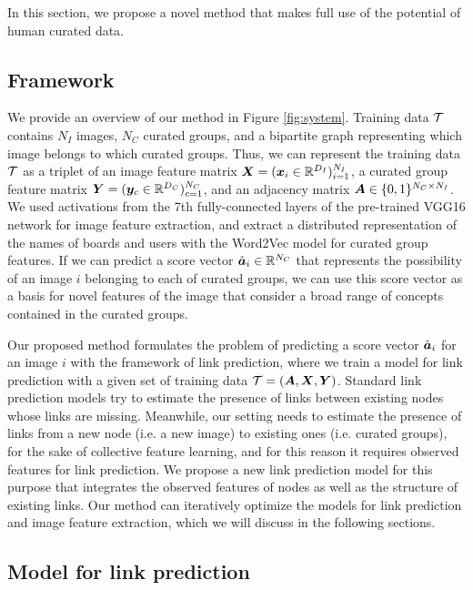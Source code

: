 \documentclass[letterpaper]{article} %
\begin{document}
In this section, we propose a novel method that makes full use of the potential of human curated data.

\subsection{Framework}
\label{sec:proposed:framework}
\indent

We provide an overview of our method in Figure \ref{fig:system}.
Training data $\mathcal T$ contains $N_I$ images, $N_C$ curated groups, and a bipartite graph representing which image belongs to which curated groups.
Thus, we can represent the training data $\mathcal T$ as a triplet of an image feature matrix $\bm{X}=(\bm{x}_i\in\mathbb R^{D_I})_{i=1}^{N_I}$, a curated group feature matrix $\bm{Y}=(\bm{y}_c\in\mathbb R^{D_C})_{c=1}^{N_C}$, and an adjacency matrix $\bm{A}\in\{0,1\}^{N_C\times N_I}$.
We used activations from the 7th fully-connected layers of the pre-trained VGG16 network \cite{Simonyan2014} for image feature extraction, and extract a distributed representation of the names of boards and users with the Word2Vec model \cite{Mikolov2013} for curated group features.
If we can predict a score vector $\hat{\bm{a}}_i\in\mathbb R^{N_C}$ that represents the possibility of an image $i$ belonging to each of curated groups, we can use this score vector as a basis for novel features of the image that consider a broad range of concepts contained in the curated groups.

Our proposed method formulates the problem of predicting a score vector $\hat{\bm{a}}_i$ for an image $i$ with the framework of link prediction, where we train a model for link prediction with a given set of training data $\mathcal T=(\bm{A},\bm{X},\bm{Y})$.
Standard link prediction models try to estimate the presence of links between existing nodes whose links are missing.
Meanwhile, our setting needs to estimate the presence of links from a new node (i.e. a new image) to existing ones (i.e. curated groups), for the sake of collective feature learning, and for this reason it requires observed features for link prediction.
We propose a new link prediction model for this purpose that integrates the observed features of nodes as well as the structure of existing links.
Our method can iteratively optimize the models for link prediction and image feature extraction, which we will discuss in the following sections.

\subsection{Model for link prediction}
\label{sec:proposed:link}
\indent
\end{document}
